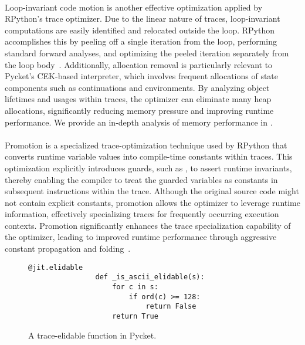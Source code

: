         \paragraph{}%
            Loop-invariant code motion is another effective optimization applied by RPython’s trace optimizer. Due to the linear nature of traces, loop-invariant computations are easily identified and relocated outside the loop. RPython accomplishes this by peeling off a single iteration from the loop, performing standard forward analyses, and optimizing the peeled iteration separately from the loop body~\cite{loop-aware:12}. Additionally, allocation removal is particularly relevant to Pycket’s CEK-based interpreter, which involves frequent allocations of state components such as continuations and environments. By analyzing object lifetimes and usages within traces, the optimizer can eliminate many heap allocations, significantly reducing memory pressure and improving runtime performance. We provide an in-depth analysis of memory performance in .

        \paragraph{}%
            Promotion is a specialized trace-optimization technique used by RPython that converts runtime variable values into compile-time constants within traces. This optimization explicitly introduces guards, such as , to assert runtime invariants, thereby enabling the compiler to treat the guarded variables as constants in subsequent instructions within the trace. Although the original source code might not contain explicit constants, promotion allows the optimizer to leverage runtime information, effectively specializing traces for frequently occurring execution contexts. Promotion significantly enhances the trace specialization capability of the optimizer, leading to improved runtime performance through aggressive constant propagation and folding~\cite{bolzPhDThesis}.

        \begin{figure}[!htbp]                    %
            \centering
            \begin{minipage}{0.3\textwidth}
            \begin{lstlisting}[style=python-style,gobble=16]
                @jit.elidable
                def _is_ascii_elidable(s):
                    for c in s:
                        if ord(c) >= 128:
                            return False
                    return True
            \end{lstlisting}
            \end{minipage}
            \caption{A trace-elidable function in Pycket.}
            \label{fig:elidable-function}
        \end{figure}

